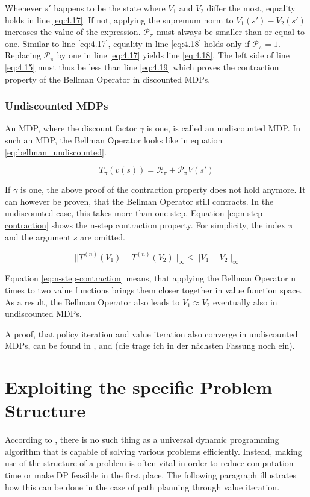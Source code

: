 Whenever $s'$ happens to be the state where $V_1$ and $V_2$ differ the most, equality holds in line \ref{eq:4.17}. If not, applying the supremum norm to $V_1(s')-V_2(s')$ increases the value of the expression. $\mathcal{P}_\pi$ must always be smaller than or equal to one. Similar to line \ref{eq:4.17}, equality in line \ref{eq:4.18} holds only if $\mathcal{P}_\pi=1$. Replacing $\mathcal{P}_\pi$ by one in line \ref{eq:4.17} yields line \ref{eq:4.18}. The left side of line \ref{eq:4.15} must thus be less than line \ref{eq:4.19} which proves the contraction property of the Bellman Operator in discounted MDPs.

\subsubsection*{Undiscounted MDPs}

An MDP, where the discount factor $\gamma$ is one, is called an undiscounted MDP. In such an MDP, the Bellman Operator looks like in equation \ref{eq:bellman_undiscounted}.

\begin{equation}
T_\pi(v(s))=\mathcal{R}_\pi + \mathcal{P}_\pi V(s')
\label{eq:bellman_undiscounted}
\end{equation}

If $\gamma$ is one, the above proof of the contraction property does not hold anymore. It can however be proven, that the Bellman Operator still contracts. In the undiscounted case, this takes more than one step. Equation \ref{eq:n-step-contraction} shows the n-step contraction property. For simplicity, the index $\pi$ and the argument $s$ are omitted.

\begin{equation}
||T^{(n)}(V_1)-T^{(n)}(V_2)||_\infty \leq ||V_1-V_2||_\infty
\label{eq:n-step-contraction}
\end{equation}

Equation \ref{eq:n-step-contraction} means, that applying the Bellman Operator n times to two value functions brings them closer together in value function space. As a result, the Bellman Operator also leads to $V_1 \approx V_2$ eventually also in undiscounted MDPs.

A proof, that policy iteration and value iteration also converge in undiscounted MDPs, can be found in \cite{},\cite{} and \cite{} (die trage ich in der nächsten Fassung noch ein).

\section{Exploiting the specific Problem Structure}
\label{sec:prob_structure}
According to \cite{Powell2007ADP}, there is no such thing as a universal dynamic programming algorithm that is capable of solving various problems efficiently. Instead, making use of the structure of a problem is often vital in order to reduce computation time or make DP feasible in the first place. The following paragraph illustrates how this can be done in the case of path planning through value iteration.

